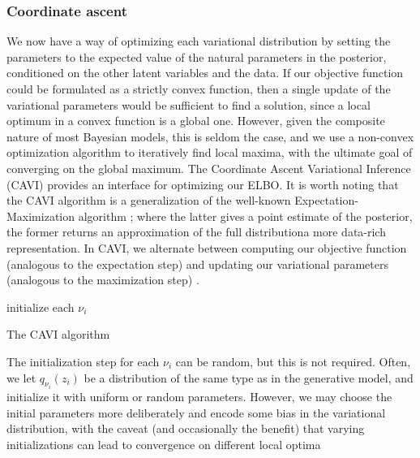 \documentclass[12pt,letterpaper]{article}
\begin{document}
\subsubsection{Coordinate ascent}
We now have a way of optimizing each variational distribution by setting the parameters to the expected value of the natural parameters in the posterior, conditioned on the other latent variables and the data. If our objective function could be formulated as a strictly convex function, then a single update of the variational parameters would be sufficient to find a solution, since a local optimum in a convex function is a global one. However, given the composite nature of most Bayesian models, this is seldom the case, and we use a non-convex optimization algorithm to iteratively find local maxima, with the ultimate goal of converging on the global maximum. The Coordinate Ascent Variational Inference (CAVI) provides an interface for optimizing our ELBO. It is worth noting that the CAVI algorithm is a generalization of the well-known Expectation-Maximization algorithm \citep{dempster:1977}; where the latter gives a point estimate of the posterior, the former returns an approximation of the full distribution\textemdash a more data-rich representation. In CAVI, we alternate between computing our objective function (analogous to the expectation step) and updating our variational parameters (analogous to the maximization step) \citep{neal:1998}.


\begin{algorithm}[H]
initialize each $\nu_i$ \\
\caption{The CAVI algorithm}

\end{algorithm}

\noindent The initialization step for each $\nu_i$ can be random, but this is not required. Often, we let $q_{\nu_i}(z_i)$ be a distribution of the same type as in the generative model, and initialize it with uniform or random parameters. However, we may choose the initial parameters more deliberately and encode some bias in the variational distribution, with the caveat (and occasionally the benefit) that varying initializations can lead to convergence on different local optima \citep{blei:2017}
\end{document}
